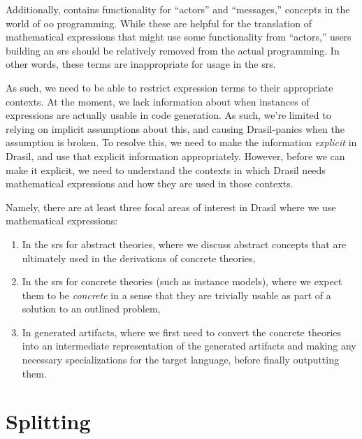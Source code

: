 Additionally, \Expr{} contains functionality for ``actors'' and ``messages,''
concepts in the world of \acs{oo} programming. While these are helpful for the
translation of mathematical expressions that might use some functionality from
``actors,'' users building an \acs{srs} should be relatively removed from the
actual programming. In other words, these terms are inappropriate for usage in
the \acs{srs}.

As such, we need to be able to restrict expression terms to their appropriate
contexts. At the moment, we lack information about when instances of expressions
are actually usable in code generation. As such, we're limited to relying on
implicit assumptions about this, and causing Drasil-panics when the assumption
is broken. To resolve this, we need to make the information \textit{explicit} in
Drasil, and use that explicit information appropriately. However, before we can
make it explicit, we need to understand the contexts in which Drasil needs
mathematical expressions and how they are used in those contexts.

Namely, there are at least three focal areas of interest in Drasil where we use
mathematical expressions:

\begin{enumerate}

    \item In the \acs{srs} for abstract theories, where we discuss abstract
          concepts that are ultimately used in the derivations of concrete
          theories,

    \item In the \acs{srs} for concrete theories (such as instance models),
          where we expect them to be \textit{concrete} in a sense that they are
          trivially usable as part of a solution to an outlined problem,

    \item In generated artifacts, where we first need to convert the
          concrete theories into an intermediate representation of the generated
          artifacts and making any necessary specializations for the target
          language, before finally outputting them.

\end{enumerate}

\section{Splitting}
\label{chap:lang-division:sec:splitting}

